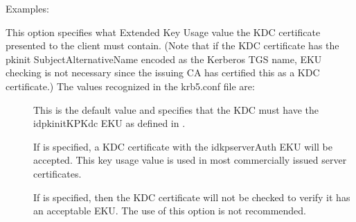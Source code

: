 \documentclass[letterpaper,10pt,english]{sphinxmanual}
\begin{document}
\begin{description}
\sphinxAtStartPar
Examples:

\begin{sphinxVerbatim}[commandchars=\\\{\}]
  
  
  
\end{sphinxVerbatim}

\item[{\sphinxstylestrong{pkinit\_eku\_checking}}] \leavevmode
\sphinxAtStartPar
This option specifies what Extended Key Usage value the KDC
certificate presented to the client must contain.  (Note that if
the KDC certificate has the pkinit SubjectAlternativeName encoded
as the Kerberos TGS name, EKU checking is not necessary since the
issuing CA has certified this as a KDC certificate.)  The values
recognized in the krb5.conf file are:
\begin{description}
\item[{}] \leavevmode
\sphinxAtStartPar
This is the default value and specifies that the KDC must have
the id\sphinxhyphen{}pkinit\sphinxhyphen{}KPKdc EKU as defined in .

\item[{}] \leavevmode
\sphinxAtStartPar
If  is specified, a KDC certificate with the
id\sphinxhyphen{}kp\sphinxhyphen{}serverAuth EKU will be accepted.  This key usage value
is used in most commercially issued server certificates.

\item[{}] \leavevmode
\sphinxAtStartPar
If  is specified, then the KDC certificate will not be
checked to verify it has an acceptable EKU.  The use of this
option is not recommended.


\end{description}
\end{description}
\end{document}

